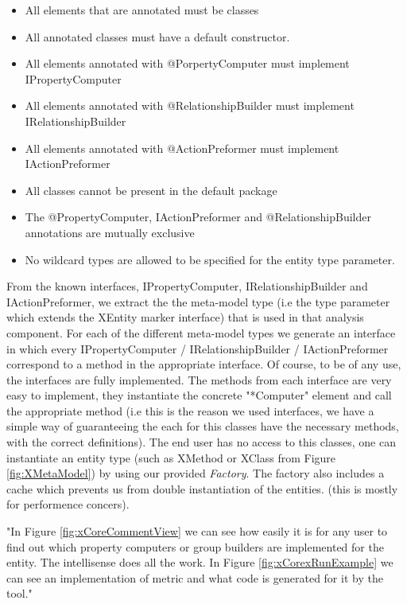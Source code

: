         \begin{itemize}
              \item All elements that are annotated must be classes
              \item All annotated classes must have a default constructor.
              \item All elements annotated with @PorpertyComputer must implement
         IPropertyComputer
              \item All elements annotated with @RelationshipBuilder must implement
         IRelationshipBuilder
              \item All elements annotated with @ActionPreformer must implement
         IActionPreformer
              \item  All classes cannot be present in the default package
              \item  The @PropertyComputer, IActionPreformer and @RelationshipBuilder annotations are mutually
        exclusive
              \item  No wildcard types are allowed to be specified for the entity type
         parameter.
            \end{itemize}

        From the known interfaces, IPropertyComputer, IRelationshipBuilder and IActionPreformer, we extract the the meta-model type (i.e the type parameter which extends the XEntity marker interface) 
that is used in that analysis component. For each of the different meta-model types we generate an interface in which every IPropertyComputer / IRelationshipBuilder / IActionPreformer correspond to
a method in the appropriate interface. Of course, to be of any use, the interfaces are fully implemented. The methods from each interface are very easy to implement, they instantiate the concrete "*Computer"
element and call the appropriate method (i.e this is the reason we used interfaces, we have a simple way of guaranteeing the each for this classes have the necessary methods, with the correct definitions). 
The end user has no access to this classes, one can instantiate an entity type (such as XMethod or XClass from Figure \ref{fig:XMetaModel}) by using our provided \textit{Factory}. The factory also includes a cache 
which prevents us from double instantiation of the entities. (this is mostly for performence concers).

        "In Figure \ref{fig:xCoreCommentView} we can see how easily it is for any user to find out which property computers or group builders are implemented for the
entity. The intellisense does all the work. In Figure \ref{fig:xCorexRunExample} we can see an implementation of metric and what code is generated for it by the tool." \cite{oldThesis}

